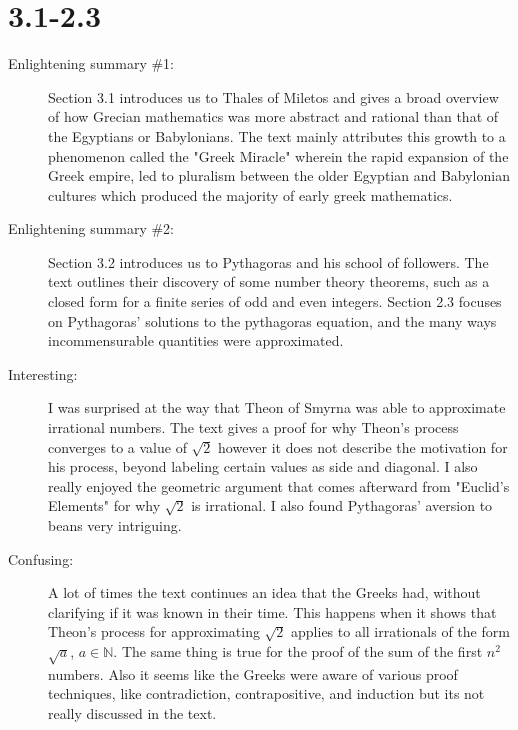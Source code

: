 \documentclass[12pt]{article}
\theoremstyle{homework}
\newcommand{\Nats}{\ensuremath{\mathbb N}}
\begin{document}
\section*{3.1-2.3}

\begin{description}
%
\item[Enlightening summary \#1:] Section 3.1 introduces us to Thales of Miletos and gives a broad overview of how Grecian 
mathematics was more abstract and rational than that of the Egyptians or Babylonians. The text mainly attributes this growth to 
a phenomenon called the "Greek Miracle" wherein the rapid expansion of the Greek empire, led to pluralism between the older Egyptian and
Babylonian cultures which produced the majority of early greek mathematics.
%
\item[Enlightening summary \#2:]  Section 3.2 introduces us to Pythagoras and his school of followers. The text outlines 
their discovery of some number theory theorems, such as a closed form for a finite series of odd and even integers. Section 2.3 focuses on 
Pythagoras' solutions to the pythagoras equation, and the many ways incommensurable quantities were approximated. 


\item[Interesting:] I was surprised at the way that Theon of Smyrna was able to approximate irrational numbers. The text gives a proof for why 
Theon's process converges to a value of $\sqrt{2}$ however it does not describe the motivation for his process, beyond labeling certain values as side and diagonal.   
I also really enjoyed the geometric argument that comes afterward from "Euclid's Elements" for why $\sqrt{2}$ is irrational. I also found Pythagoras' aversion to beans very intriguing.

\item[Confusing:] A lot of times the text continues an idea that the Greeks had, without clarifying if it was known in their time. This happens when it shows that Theon's process for approximating $\sqrt{2}$
applies to all irrationals of the form $\sqrt{a}$, $a \in \Nats$. The same thing is true for 
the proof of the sum of the first $n^2$ numbers. Also it seems like the Greeks were aware of various proof techniques, like contradiction, contrapositive, and induction but 
its not really discussed in the text.

\end{description}
\end{document}
